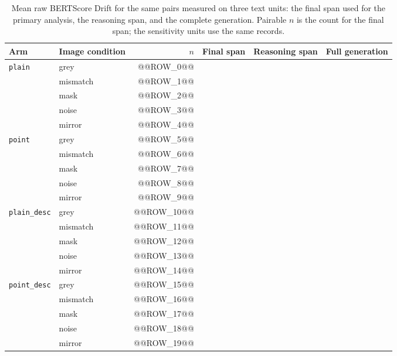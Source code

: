 \begin{table}[ht]
\centering
\caption[Drift by rationale text unit]{Mean raw BERTScore Drift for the same pairs measured on three text units: the final span used for the primary analysis, the reasoning span, and the complete generation. Pairable $n$ is the count for the final span; the sensitivity units use the same records.}
\label{tab:app-rq2-text-unit}
\begin{tabular}{llrrrr}
\toprule
Arm & Image condition & $n$ & Final span & Reasoning span & Full generation \\
\midrule
\texttt{plain} & grey & @@ROW_0@@ \\
 & mismatch & @@ROW_1@@ \\
 & mask & @@ROW_2@@ \\
 & noise & @@ROW_3@@ \\
 & mirror & @@ROW_4@@ \\
\texttt{point} & grey & @@ROW_5@@ \\
 & mismatch & @@ROW_6@@ \\
 & mask & @@ROW_7@@ \\
 & noise & @@ROW_8@@ \\
 & mirror & @@ROW_9@@ \\
\texttt{plain\_desc} & grey & @@ROW_10@@ \\
 & mismatch & @@ROW_11@@ \\
 & mask & @@ROW_12@@ \\
 & noise & @@ROW_13@@ \\
 & mirror & @@ROW_14@@ \\
\texttt{point\_desc} & grey & @@ROW_15@@ \\
 & mismatch & @@ROW_16@@ \\
 & mask & @@ROW_17@@ \\
 & noise & @@ROW_18@@ \\
 & mirror & @@ROW_19@@ \\
\bottomrule
\end{tabular}
\end{table}

